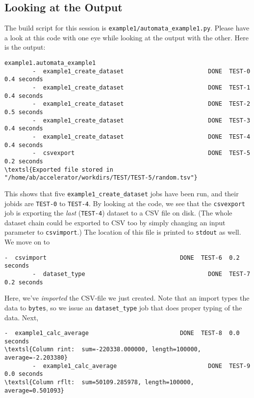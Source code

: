 \documentclass[a4paper]{article}
\begin{document}
\subsection*{Looking at the Output}
The build script for this session is
\texttt{example1/automata\_example1.py}.  Please have a look at this
code with one eye while looking at the output with the other.  Here is the output:
\begin{snugshade}
\begin{Verbatim}[commandchars=\\\{\}]
example1.automata_example1
        -  example1_create_dataset                        DONE  TEST-0  0.4 seconds
        -  example1_create_dataset                        DONE  TEST-1  0.4 seconds
        -  example1_create_dataset                        DONE  TEST-2  0.5 seconds
        -  example1_create_dataset                        DONE  TEST-3  0.4 seconds
        -  example1_create_dataset                        DONE  TEST-4  0.4 seconds
        -  csvexport                                      DONE  TEST-5  0.2 seconds
\textsl{Exported file stored in "/home/ab/accelerator/workdirs/TEST/TEST-5/random.tsv"}
\end{Verbatim}
\end{snugshade}
\noindent This shows that five \texttt{example1\_create\_dataset} jobs have been
run, and their jobids are \texttt{TEST-0} to \texttt{TEST-4}.  By
looking at the code, we see that the \texttt{csvexport} job is
exporting the \textsl{last} (\texttt{TEST-4}) dataset to a CSV file on
disk.  (The whole dataset chain could be exported to CSV too by simply
changing an input parameter to \texttt{csvimport}.) The location of
this file is printed to \texttt{stdout} as well.  We move on to
\begin{snugshade}
\begin{Verbatim}[commandchars=\\\{\}]
        -  csvimport                                      DONE  TEST-6  0.2 seconds
        -  dataset_type                                   DONE  TEST-7  0.2 seconds
\end{Verbatim}
\end{snugshade}
\noindent Here, we've \textsl{imported} the CSV-file we just created.  Note
that an import types the data to \texttt{bytes}, so we issue an
\texttt{dataset\_type} job that does proper typing of the data.  Next,
\begin{snugshade}
\begin{Verbatim}[commandchars=\\\{\}]
        -  example1_calc_average                          DONE  TEST-8  0.0 seconds
\textsl{Column rint:  sum=-220338.000000, length=100000, average=-2.203380}
        -  example1_calc_average                          DONE  TEST-9  0.0 seconds
\textsl{Column rflt:  sum=50109.285978, length=100000, average=0.501093}
\end{Verbatim}
\end{snugshade}
\end{document}
